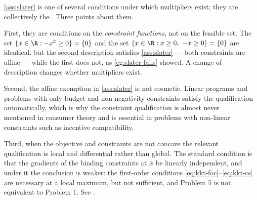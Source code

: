 \begin{remark}\label{rem:constraint-qualification}
	\autoref{ass:slater} is one of several conditions under which multipliers exist;
	they are collectively the . Three points about them.

	First, they are conditions on the \emph{constraint functions}, not on the
	feasible set. The set $\{x\in\R : -x^2\geq0\}=\{0\}$ and the set
	$\{x\in\R : x\geq0,\ -x\geq0\}=\{0\}$ are identical, but the second
	description satisfies \autoref{ass:slater} --- both constraints are affine ---
	while the first does not, as \autoref{eg:slater-fails} showed. A change of
	description changes whether multipliers exist.

	Second, the affine exemption in \autoref{ass:slater} is not cosmetic. Linear
	programs and problems with only budget and non-negativity constraints satisfy
	the qualification automatically, which is why the constraint qualification is
	almost never mentioned in consumer theory and is essential in problems with
	non-linear constraints such as incentive compatibility.

	Third, when the objective and constraints are not concave the relevant
	qualification is local and differential rather than global. The standard
	condition is that the gradients of the binding constraints at $\bar x$ be
	linearly independent, and under it the conclusion is weaker: the first-order
	conditions \eqref{eq:kkt-foc}--\eqref{eq:kkt-cs} are necessary at a local
	maximum, but not sufficient, and Problem 5 is not equivalent to Problem 1. See
	\textcite[Ch.~7]{mangasarian1994nonlinear}.
\end{remark}

